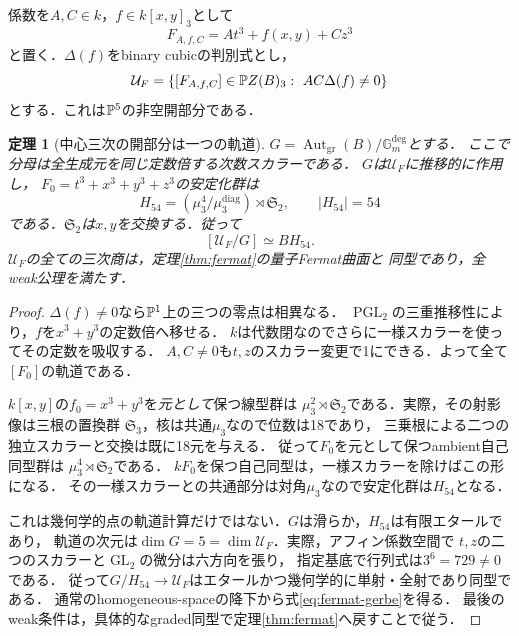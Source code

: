 \documentclass[11pt,a4paper]{ltjsarticle}
\newtheorem{theorem}{定理}[section]
\theoremstyle{definition}\newtheorem{definition}[theorem]{定義}
\newcommand{\PGL}{\operatorname{PGL}}\newcommand{\GL}{\operatorname{GL}}
\begin{document}
係数を$A,C\in k$，$f\in k[x,y]_3$として
\[
 F_{A,f,C}=At^3+f(x,y)+Cz^3
\]
と置く．$\Delta(f)$をbinary cubicの判別式とし，
\begin{equation}\label{eq:fermat-open}
 \mathcal U_F=\{[F_{A,f,C}]\in\mathbb P Z(B)_3:\ AC\Delta(f)\ne0\}
\end{equation}
とする．これは$\mathbb P^5$の非空開部分である．
\begin{theorem}[中心三次の開部分は一つの軌道]\label{thm:fermat-gerbe}
$G=\operatorname{Aut}_{\mathrm{gr}}(B)/\mathbb G_m^{\mathrm{deg}}$とする．
ここで分母は全生成元を同じ定数倍する次数スカラーである．
$G$は$\mathcal U_F$に推移的に作用し，
$F_0=t^3+x^3+y^3+z^3$の安定化群は
\[
 H_{54}=(\mu_3^4/\mu_3^{\mathrm{diag}})\rtimes\mathfrak S_2,
 \qquad |H_{54}|=54
\]
である．$\mathfrak S_2$は$x,y$を交換する．従って
\begin{equation}\label{eq:fermat-gerbe}
 [\mathcal U_F/G]\simeq B H_{54}.
\end{equation}
$\mathcal U_F$の全ての三次商は，定理\ref{thm:fermat}の量子Fermat曲面と
同型であり，全weak公理を満たす．
\end{theorem}
\begin{proof}
$\Delta(f)\ne0$なら$\mathbb P^1$上の三つの零点は相異なる．
$\PGL_2$の三重推移性により，$f$を$x^3+y^3$の定数倍へ移せる．
$k$は代数閉なのでさらに一様スカラーを使ってその定数を吸収する．
$A,C\ne0$も$t,z$のスカラー変更で1にできる．よって全て$[F_0]$の軌道である．

$k[x,y]$の$f_0=x^3+y^3$を\emph{元として}保つ線型群は
$\mu_3^2\rtimes\mathfrak S_2$である．実際，その射影像は三根の置換群
$\mathfrak S_3$，核は共通$\mu_3$なので位数は18であり，
三乗根による二つの独立スカラーと交換は既に18元を与える．
従って$F_0$を元として保つambient自己同型群は
$\mu_3^4\rtimes\mathfrak S_2$である．
$kF_0$を保つ自己同型は，一様スカラーを除けばこの形になる．
その一様スカラーとの共通部分は対角$\mu_3$なので安定化群は$H_{54}$となる．

これは幾何学的点の軌道計算だけではない．$G$は滑らか，$H_{54}$は有限エタールであり，
軌道の次元は$\dim G=5=\dim\mathcal U_F$．実際，アフィン係数空間で
$t,z$の二つのスカラーと$\GL_2$の微分は六方向を張り，
指定基底で行列式は$3^6=729\ne0$である．
従って$G/H_{54}\to\mathcal U_F$はエタールかつ幾何学的に単射・全射であり同型である．
通常のhomogeneous-spaceの降下から式\eqref{eq:fermat-gerbe}を得る．
最後のweak条件は，具体的なgraded同型で定理\ref{thm:fermat}へ戻すことで従う．
\end{proof}
\end{document}
